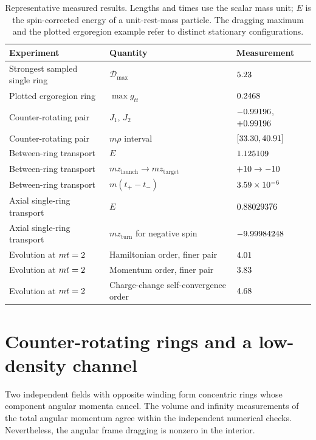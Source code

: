 \documentclass[10pt,twocolumn,floatfix,aps,prd,superscriptaddress,nofootinbib]{revtex4-2}
\begin{document}
\begin{table}[t]
\caption{Representative measured results. Lengths and times use the scalar
mass unit; $E$ is the spin-corrected energy of a unit-rest-mass particle.
The dragging maximum and the plotted ergoregion example refer to distinct
stationary configurations.}
\label{tab:results}
\begin{ruledtabular}
\begin{tabular}{lll}
Experiment & Quantity & Measurement\\
\hline
Strongest sampled single ring & $\mathcal{D}_{\max}$ & $5.23$\\
Plotted ergoregion ring & $\max g_{tt}$ & $0.2468$\\
Counter-rotating pair & $J_1$, $J_2$ & $-0.99196$, $+0.99196$\\
Counter-rotating pair & $m\rho$ interval & $[33.30,40.91]$\\
Between-ring transport & $E$ & $1.125109$\\
Between-ring transport & $mz_{\mathrm{launch}}\to mz_{\mathrm{target}}$ & $+10\to-10$\\
Between-ring transport & $m(t_+-t_-)$ & $3.59\times10^{-6}$\\
Axial single-ring transport & $E$ & $0.88029376$\\
Axial single-ring transport & $mz_{\mathrm{turn}}$ for negative spin & $-9.99984248$\\
Evolution at $mt=2$ & Hamiltonian order, finer pair & $4.01$\\
Evolution at $mt=2$ & Momentum order, finer pair & $3.83$\\
Evolution at $mt=2$ & Charge-change self-convergence order & $4.68$\\
\end{tabular}
\end{ruledtabular}
\end{table}

\section{Counter-rotating rings and a low-density channel}
\label{sec:channel}

Two independent fields with opposite winding form concentric rings whose
component angular momenta cancel. The volume and infinity measurements of
the total angular momentum agree within the independent numerical checks.
Nevertheless, the angular frame dragging is nonzero in the interior.
\end{document}
